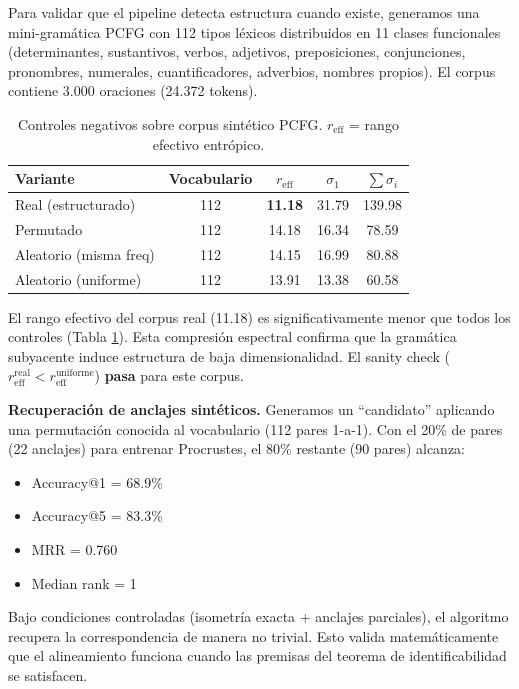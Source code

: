 \documentclass[11pt,a4paper]{article}
\newcommand{\1}{\mathbf{1}}
\numberwithin{equation}{section}
\begin{document}
Para validar que el pipeline detecta estructura cuando existe, generamos una mini-gramática PCFG con 112 tipos léxicos distribuidos en 11 clases funcionales (determinantes, sustantivos, verbos, adjetivos, preposiciones, conjunciones, pronombres, numerales, cuantificadores, adverbios, nombres propios). El corpus contiene 3.000 oraciones (24.372 tokens).

\begin{table}[h]
\centering
\caption{Controles negativos sobre corpus sintético PCFG. $r_{\text{eff}}$ = rango efectivo entrópico.}
\label{tab:control_pcfg}
\begin{tabular}{lcccc}
\toprule
Variante & Vocabulario & $r_{\text{eff}}$ & $\sigma_1$ & $\sum \sigma_i$ \\
\midrule
Real (estructurado) & 112 & \textbf{11.18} & 31.79 & 139.98 \\
Permutado & 112 & 14.18 & 16.34 & 78.59 \\
Aleatorio (misma freq) & 112 & 14.15 & 16.99 & 80.88 \\
Aleatorio (uniforme) & 112 & 13.91 & 13.38 & 60.58 \\
\bottomrule
\end{tabular}
\end{table}

El rango efectivo del corpus real (11.18) es significativamente menor que todos los controles (Tabla \ref{tab:control_pcfg}). Esta compresión espectral confirma que la gramática subyacente induce estructura de baja dimensionalidad. El sanity check ($r_{\text{eff}}^{\text{real}} < r_{\text{eff}}^{\text{uniforme}}$) \textbf{pasa} para este corpus.

\textbf{Recuperación de anclajes sintéticos.} Generamos un ``candidato'' aplicando una permutación conocida al vocabulario (112 pares 1-a-1). Con el 20\% de pares (22 anclajes) para entrenar Procrustes, el 80\% restante (90 pares) alcanza:
\begin{itemize}
    \item Accuracy@1 = 68.9\%
    \item Accuracy@5 = 83.3\%
    \item MRR = 0.760
    \item Median rank = 1
\end{itemize}

Bajo condiciones controladas (isometría exacta + anclajes parciales), el algoritmo recupera la correspondencia de manera no trivial. Esto valida matemáticamente que el alineamiento funciona cuando las premisas del teorema de identificabilidad se satisfacen.
\end{document}
